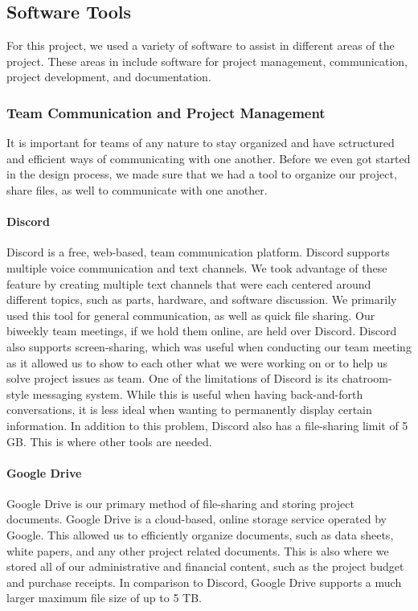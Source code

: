 \subsection{Software Tools}
For this project, we used a variety of software to assist in different areas of the project. These areas in include software for project management, communication, project development, and documentation.

\subsubsection{Team Communication and Project Management}
It is important for teams of any nature to stay organized and have sctructured and efficient ways of communicating with one another. Before we even got started in the design process, we made sure that we had a tool to organize our project, share files, as well to communicate with one another.

\paragraph{Discord}
Discord is a free, web-based, team communication platform. Discord supports multiple voice communication and text channels. We took advantage of these feature by creating multiple text channels that were each centered around different topics, such as parts, hardware, and software discussion. We primarily used this tool for general communication, as well as quick file sharing. Our biweekly team meetings, if we hold them online, are held over Discord. Discord also supports screen-sharing, which was useful when conducting our team meeting as it allowed us to show to each other what we were working on or to help us solve project issues as team. One of the limitations of Discord is its chatroom-style messaging system. While this is useful when having back-and-forth conversations, it is less ideal when wanting to permanently display certain information. In addition to this problem, Discord also has a file-sharing limit of 5 GB. This is where other tools are needed.

\paragraph{Google Drive}
Google Drive is our primary method of file-sharing and storing project documents. Google Drive is a cloud-based, online storage service operated by Google. This allowed us to efficiently organize documents, such as data sheets, white papers, and any other project related documents. This is also where we stored all of our administrative and financial content, such as the project budget and purchase receipts. In comparison to Discord, Google Drive supports a much larger maximum file size of up to 5 TB.

